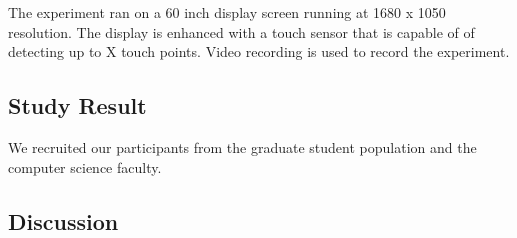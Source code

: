 The experiment ran on a 60 inch display screen running at 1680 x 1050
resolution. The display is enhanced with a touch sensor that is capable of of
detecting up to X touch points. Video recording is used to record the
experiment.

\subsection{Study Result}
We recruited our participants from the graduate student population and the
computer science faculty.

\subsection{Discussion}